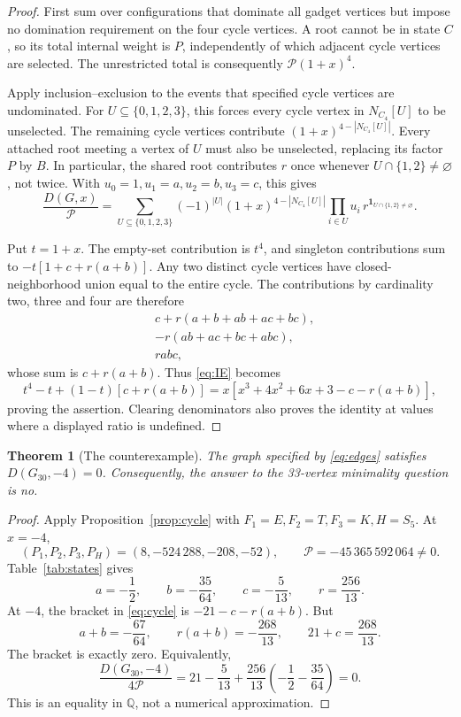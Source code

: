 \documentclass[11pt]{article}
\numberwithin{equation}{section}
\newtheorem{theorem}{Theorem}[section]
\theoremstyle{definition}
\newcommand{\D}{D}
\newcommand{\Q}{\mathbb{Q}}
\newcommand{\Gthirty}{G_{30}}
\begin{document}
\begin{proof}
First sum over configurations that dominate all gadget vertices but
impose no domination requirement on the four cycle vertices. A root
cannot be in state \(C\), so its total internal weight is \(P\),
independently of which adjacent cycle vertices are selected. The
unrestricted total is consequently \(\mathcal P(1+x)^4\).

Apply inclusion--exclusion to the events that specified cycle vertices
are undominated. For \(U\subseteq\{0,1,2,3\}\), this forces every cycle
vertex in \(N_{C_4}[U]\) to be unselected. The remaining cycle vertices
contribute \((1+x)^{4-|N_{C_4}[U]|}\). Every attached root meeting a
vertex of \(U\) must also be unselected, replacing its factor \(P\) by
\(B\). In particular, the shared root contributes \(r\) once whenever
\(U\cap\{1,2\}\ne\varnothing\), not twice. With
\(u_0=1,u_1=a,u_2=b,u_3=c\), this gives
\begin{equation}\label{eq:IE}
 \frac{\D(G,x)}{\mathcal P}=
 \sum_{U\subseteq\{0,1,2,3\}}
 (-1)^{|U|}(1+x)^{4-|N_{C_4}[U]|}
 \prod_{i\in U}u_i\,
 r^{\mathbf1_{U\cap\{1,2\}\ne\varnothing}}.
\end{equation}

Put \(t=1+x\). The empty-set contribution is \(t^4\), and singleton
contributions sum to \(-t[1+c+r(a+b)]\). Any two distinct cycle
vertices have closed-neighborhood union equal to the entire cycle.
The contributions by cardinality two, three and four are therefore
\begin{align*}
 &c+r(a+b+ab+ac+bc),\\
 &-r(ab+ac+bc+abc),\\
 &rabc,
\end{align*}
whose sum is \(c+r(a+b)\). Thus \eqref{eq:IE} becomes
\[
 t^4-t+(1-t)[c+r(a+b)]
 =x[x^3+4x^2+6x+3-c-r(a+b)],
\]
proving the assertion. Clearing denominators also proves the identity
at values where a displayed ratio is undefined.
\end{proof}

\begin{theorem}[The counterexample]\label{thm:root}
The graph specified by \eqref{eq:edges} satisfies \(\D(\Gthirty,-4)=0\).
Consequently, the answer to the 33-vertex minimality question is no.
\end{theorem}
\begin{proof}
Apply Proposition~\ref{prop:cycle} with
\(F_1=E,F_2=T,F_3=K,H=S_5\). At \(x=-4\),
\[
 (P_1,P_2,P_3,P_H)=(8,-524\,288,-208,-52),
 \qquad \mathcal P=-45\,365\,592\,064\ne0.
\]
Table~\ref{tab:states} gives
\[
 a=-\frac12,\qquad b=-\frac{35}{64},\qquad
 c=-\frac5{13},\qquad r=\frac{256}{13}.
\]
At \(-4\), the bracket in \eqref{eq:cycle} is
\(-21-c-r(a+b)\). But
\[
 a+b=-\frac{67}{64},\qquad r(a+b)=-\frac{268}{13},
 \qquad 21+c=\frac{268}{13}.
\]
The bracket is exactly zero. Equivalently,
\begin{equation}\label{eq:oneline}
 \frac{\D(\Gthirty,-4)}{4\mathcal P}
 =21-\frac5{13}+\frac{256}{13}
   \left(-\frac12-\frac{35}{64}\right)=0.
\end{equation}
This is an equality in \(\Q\), not a numerical approximation.
\end{proof}
\end{document}
